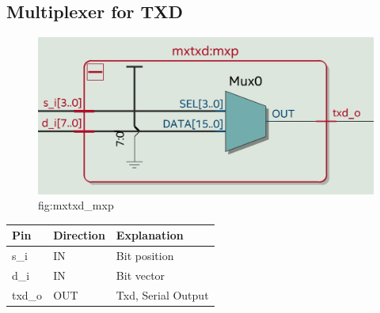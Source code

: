 \documentclass[12pt,a4 paper] {article}
\begin{document}
\subsection{Multiplexer for TXD}
\begin{figure}[h]
	\centering	
	\includegraphics[scale=0.2]{../png/mxtxd_mxp.png}
	\newline
	fig:mxtxd\_mxp\\
\end{figure}
\begin{center}
	\begin{tabular}{| p{2cm} | p{2cm} | p{4cm} |}
		\hline
		Pin & Direction  & Explanation\\
		
		\hline
		s\_i   &IN & Bit position\\
		\hline
		d\_i   & IN & Bit vector\\
		\hline
		txd\_o & OUT & Txd, Serial Output\\
		\hline	
		
	\end{tabular}
\end{center} 
\end{document}

